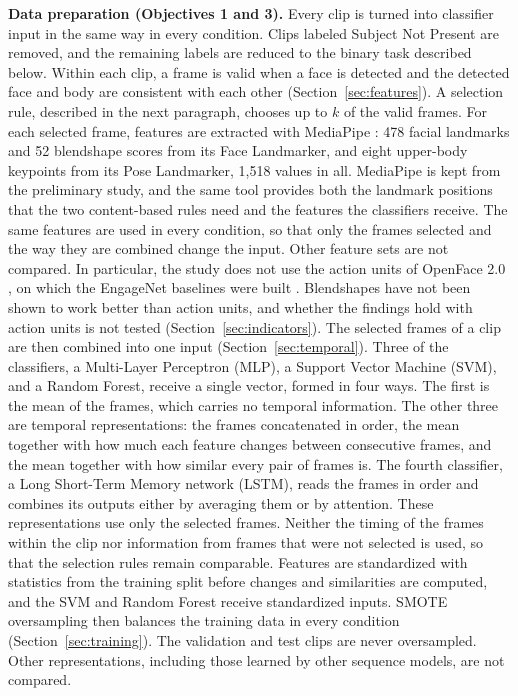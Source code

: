 \textbf{Data preparation (Objectives 1 and 3).} Every clip is turned into classifier input in the same way in every condition. Clips labeled Subject Not Present are removed, and the remaining labels are reduced to the binary task described below. Within each clip, a frame is valid when a face is detected and the detected face and body are consistent with each other (Section~\ref{sec:features}). A selection rule, described in the next paragraph, chooses up to $k$ of the valid frames. For each selected frame, features are extracted with MediaPipe \cite{lugaresi2019}: 478 facial landmarks and 52 blendshape scores from its Face Landmarker, and eight upper-body keypoints from its Pose Landmarker, 1,518 values in all. MediaPipe is kept from the preliminary study, and the same tool provides both the landmark positions that the two content-based rules need and the features the classifiers receive. The same features are used in every condition, so that only the frames selected and the way they are combined change the input. Other feature sets are not compared. In particular, the study does not use the action units of OpenFace 2.0 \cite{baltrusaitis2018}, on which the EngageNet baselines were built \cite{singh2023}. Blendshapes have not been shown to work better than action units, and whether the findings hold with action units is not tested (Section~\ref{sec:indicators}). The selected frames of a clip are then combined into one input (Section~\ref{sec:temporal}). Three of the classifiers, a Multi-Layer Perceptron (MLP), a Support Vector Machine (SVM), and a Random Forest, receive a single vector, formed in four ways. The first is the mean of the frames, which carries no temporal information. The other three are temporal representations: the frames concatenated in order, the mean together with how much each feature changes between consecutive frames, and the mean together with how similar every pair of frames is. The fourth classifier, a Long Short-Term Memory network (LSTM), reads the frames in order and combines its outputs either by averaging them or by attention. These representations use only the selected frames. Neither the timing of the frames within the clip nor information from frames that were not selected is used, so that the selection rules remain comparable. Features are standardized with statistics from the training split before changes and similarities are computed, and the SVM and Random Forest receive standardized inputs. SMOTE oversampling \cite{chawla2002} then balances the training data in every condition (Section~\ref{sec:training}). The validation and test clips are never oversampled. Other representations, including those learned by other sequence models, are not compared.

